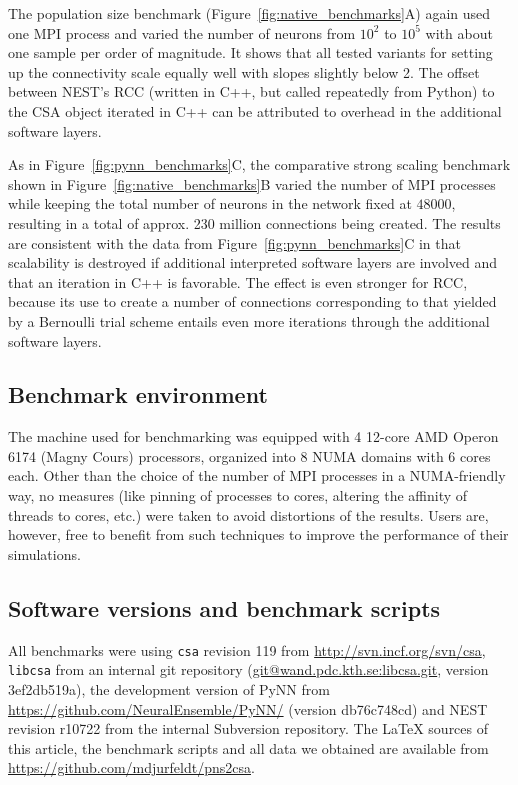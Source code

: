 \documentclass{frontiersSCNS} %
\newcommand{\Figure}[2]{Figure~\ref{#2}}
\newcommand{\Figure}[2]{Figure~#1}
\begin{document}
The population size benchmark (\Figure{5}{fig:native_benchmarks}A)
again used one MPI process and varied the number of neurons from
$10^2$ to $10^5$ with about one sample per order of magnitude. It
shows that all tested variants for setting up the connectivity scale
equally well with slopes slightly below 2. The offset between NEST's
RCC (written in C++, but called repeatedly from Python) to the CSA
object iterated in C++ can be attributed to overhead in the additional
software layers.

As in \Figure{4}{fig:pynn_benchmarks}C, the comparative strong scaling
benchmark shown in \Figure{5}{fig:native_benchmarks}B varied the
number of MPI processes while keeping the total number of neurons in
the network fixed at $48000$, resulting in a total of approx. 230
million connections being created. The results are consistent with the
data from \Figure{4}{fig:pynn_benchmarks}C in that scalability is
destroyed if additional interpreted software layers are involved and
that an iteration in C++ is favorable. The effect is even stronger for
RCC, because its use to create a number of connections corresponding
to that yielded by a Bernoulli trial scheme entails even more
iterations through the additional software layers.

\subsection{Benchmark environment}

The machine used for benchmarking was equipped with 4 12-core AMD
Operon 6174 (Magny Cours) processors, organized into 8 NUMA domains
with 6 cores each. Other than the choice of the number of MPI
processes in a NUMA-friendly way, no measures (like pinning of
processes to cores, altering the affinity of threads to cores, etc.)
were taken to avoid distortions of the results. Users are, however,
free to benefit from such techniques to improve the performance of
their simulations.

\subsection{Software versions and benchmark scripts}

All benchmarks were using \verb|csa| revision 119 from
\url{http://svn.incf.org/svn/csa}, \verb|libcsa| from an internal git
repository (\url{git@wand.pdc.kth.se:libcsa.git}, version 3ef2db519a),
the development version of PyNN from
\url{https://github.com/NeuralEnsemble/PyNN/} (version db76c748cd) and
NEST revision r10722 from the internal Subversion repository. The
\LaTeX{}  sources of this article, the benchmark scripts and all data we
obtained are available from
\url{https://github.com/mdjurfeldt/pns2csa}.
\end{document}
